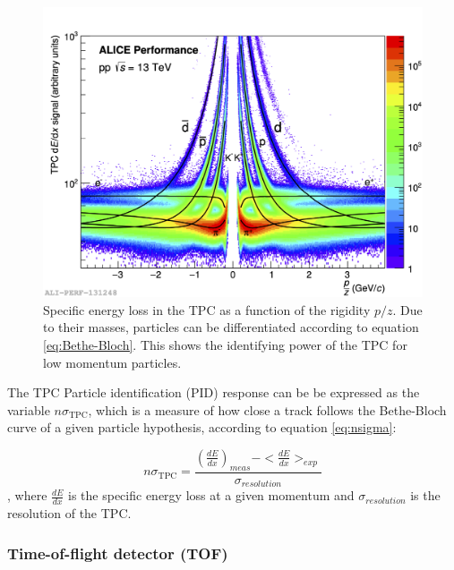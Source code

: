 \begin{figure}
    \centering
    \includegraphics[width=\textwidth]{figures/Ali_TPC_performance_pp.png}
    \caption{Specific energy loss in the TPC as a function of the rigidity $p/z$. Due to their masses, particles can be differentiated according to equation \ref{eq:Bethe-Bloch}. This shows the identifying power of the TPC for low momentum particles.}
    \label{fig:PID_TPC}
\end{figure}

The TPC Particle identification (PID) response can be be expressed as the variable $n\sigma_{\mathrm{TPC}}$, which is a measure of how close a track follows the Bethe-Bloch curve of a given particle hypothesis, according to equation \ref{eq:nsigma}:

\begin{equation}\label{eq:nsigma}
    n\sigma_{\mathrm{TPC}} = \frac{(\frac{dE}{dx})_{meas} - <\frac{dE}{dx}>_{exp}}{\sigma_{resolution}}
\end{equation}
, where $\frac{dE}{dx}$ is the specific energy loss at a given momentum and $\sigma_{resolution}$ is the resolution of the TPC. 

\subsubsection{Time-of-flight detector (TOF)}

